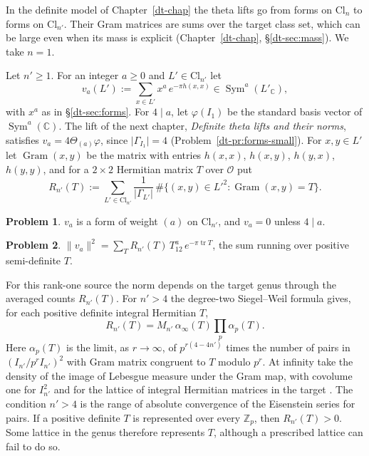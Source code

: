 \documentclass[reqno]{amsart}
\newcounter{chap}
\theoremstyle{definition}
\newtheorem{problem}{Problem}[section]
\theoremstyle{plain}
\newcommand{\Z}{\mathbb{Z}}
\newcommand{\C}{\mathbb{C}}
\newcommand{\Oc}{\mathcal{O}}
\newcommand{\Cl}{\mathrm{Cl}}
\newcommand{\Sym}{\operatorname{Sym}}
\newcommand{\Gram}{\operatorname{Gram}}
\begin{document}
In the definite model of Chapter~\ref{dt-chap} the theta lifts go from forms on \(\Cl_n\) to forms on \(\Cl_{n'}\).  Their Gram matrices are sums over the target class set, which can be large even when its mass is explicit (Chapter~\ref{dt-chap}, \S\ref{dt-sec:mass}).  We take \(n=1\).

Let \(n'\ge1\).  For an integer \(a\ge0\) and \(L' \in \Cl_{n'}\) let
\[
  v_a(L') := \sum_{x \in L'} x^a\, e^{-\pi h(x,x)} \in \Sym^a(L'_\C),
\]
with \(x^a\) as in \S\ref{dt-sec:forms}.  For \(4\mid a\), let \(\varphi(I_1)\) be the standard basis vector of \(\Sym^a(\C)\).  The lift of the next chapter, \emph{Definite theta lifts and their norms}, satisfies \(v_a=4\Theta_{(a)}\varphi\), since \(\lvert\Gamma_{I_1}\rvert=4\) (Problem~\ref{dt-pr:forms-small}).  For \(x, y \in L'\) let \(\Gram(x,y)\) be the matrix with entries \(h(x,x)\), \(h(x,y)\), \(h(y,x)\), \(h(y,y)\), and for a \(2\times2\) Hermitian matrix \(T\) over \(\Oc\) put
\[
  R_{n'}(T) := \sum_{L' \in \Cl_{n'}} \frac{1}{\lvert\Gamma_{L'}\rvert}\, \#\{(x,y) \in L'^2 : \Gram(x,y) = T\} .
\]

\begin{problem}\label{pr:va-form}
\(v_a\) is a form of weight \((a)\) on \(\Cl_{n'}\), and \(v_a = 0\) unless \(4 \mid a\).
\end{problem}

\begin{problem}\label{pr:gram}
\(\lVert v_a\rVert^2 = \sum_T R_{n'}(T)\, T_{12}^a\, e^{-\pi \operatorname{tr} T}\), the sum running over positive semi-definite \(T\).
\end{problem}

For this rank-one source the norm depends on the target genus through the averaged counts \(R_{n'}(T)\).  For \(n'>4\) the degree-two Siegel--Weil formula gives, for each positive definite integral Hermitian \(T\),
\[
 R_{n'}(T)=M_{n'}\,\alpha_\infty(T)\prod_p\alpha_p(T).
\]
Here \(\alpha_p(T)\) is the limit, as \(r\to\infty\), of \(p^{r(4-4n')}\) times the number of pairs in \((I_{n'}/p^r I_{n'})^2\) with Gram matrix congruent to \(T\) modulo \(p^r\).  At infinity take the density of the image of Lebesgue measure under the Gram map, with covolume one for \(I_{n'}^2\) and for the lattice of integral Hermitian matrices in the target \cite[Theorem~5]{We65}.  The condition \(n'>4\) is the range of absolute convergence of the Eisenstein series for pairs.  If a positive definite \(T\) is represented over every \(\Z_p\), then \(R_{n'}(T)>0\).  Some lattice in the genus therefore represents \(T\), although a prescribed lattice can fail to do so.
\end{document}
